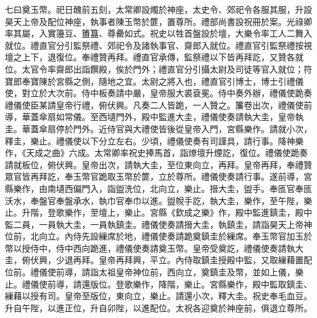 \begin{pinyinscope}
 七曰奠玉幣。祀日醜前五刻，太常卿設燭於神座，太史令、郊祀令各服其服，升設昊天上帝及配位神座，執事者陳玉幣於篚，置尊所。禮部尚書設祝冊於案。光祿卿率其屬，入實籩豆、簠簋、尊罍如式。祝史以牲首盤設於壇，大樂令率工人二舞入就位。禮直官分引監祭禮、郊祀令及諸執事官、齋郎入就位。禮直官引監祭禮按視壇之上下，退復位。奉禮贊再拜。禮直官承傳，監祭禮以下皆再拜訖，又贊各就位。太官令率齋郎出詣饌殿，俟於門外；禮直官分引攝太尉及司徒等官入就位；符寶郎奉寶陳於宮縣之側，隨地之宜。太尉之將入也，禮直官引博士，博士引禮儀使，對立於大次前。侍中板奏請中嚴，皇帝服大裘袞冕。侍中奏外辦，禮儀使跪奏禮儀使臣某請皇帝行禮，俯伏興。凡奏二人皆跪，一人贊之。簾卷出次，禮儀使前導，華蓋傘扇如常儀。至西壝門外，殿中監進大圭，禮儀使奏請執大圭，皇帝執圭。華蓋傘扇停於門外。近侍官與大禮使皆後從皇帝入門，宮縣樂作。請就小次，釋圭，樂止。禮儀使以下分立左右。少頃，禮儀使奏有司謹具，請行事。降神樂作，《天成之曲》六成。太常卿率祝史捧馬首，詣燎壇升煙訖，復位。禮儀使跪奏請就板位，俯伏興。皇帝出次，請執大圭，至位東向立，再拜。皇帝再拜，奉禮贊眾官皆再拜訖，奉玉幣官跪取玉幣於篚，立於尊所。禮儀使奏請行事。遂前導，宮縣樂作，由南壝西偏門入，詣盥洗位，北向立，樂止。搢大圭，盥手。奉匜官奉匜沃水，奉盤官奉盤承水，執巾官奉巾以進。盥帨手訖，執大圭，樂作，至午陛，樂止。升階，登歌樂作，至壇上，樂止。宮縣《欽成之樂》作，殿中監進鎮圭，殿中監二員，一員執大圭，一員執鎮圭。禮儀使奏請搢大圭，執鎮圭，請詣昊天上帝神位前，北向立。內侍先設繅席於地，禮儀使奏請跪奠鎮圭於繅席。奉玉幣官加玉於幣以授侍中，侍中西向跪進，禮儀使奏請奠玉幣。皇帝受奠訖，禮儀使奏請執大圭，俯伏興，少退再拜。皇帝再拜興，平立。內侍取鎮圭授殿中監，又取繅藉置配位前。禮儀使前導，請詣太祖皇帝神位前，西向立，奠鎮圭及幣，並如上儀，樂止。禮儀使前導，請還版位。登歌樂作，降階，樂止。宮縣樂作，殿中監取鎮圭、繅藉以授有司。皇帝至版位，東向立，樂止。請還小次，釋大圭。祝史奉毛血豆。升自午陛，以進正位，升自卯陛，以進配位。太祝各迎奠於神座前，俱退立尊所。




\end{pinyinscope}
